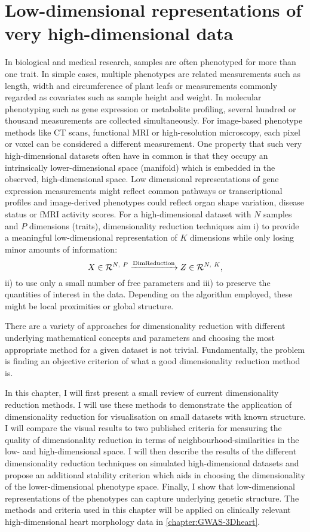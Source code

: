 \chapter{Low-dimensional representations of very high-dimensional data}
\label{chapter:DimReduction}
In biological and medical research, samples are often phenotyped for more than one trait. In simple cases, multiple phenotypes are related measurements such as length, width and circumference of plant leafs or measurements commonly regarded as covariates such as sample height and weight. In molecular phenotyping such as gene expression or metabolite profiling, several hundred or thousand measurements are collected simultaneously.  For image-based phenotype methods like CT scans, functional MRI or high-resolution microscopy, each pixel or voxel can be considered a different measurement. One property that such very high-dimensional datasets often have in common is that they occupy an intrinsically lower-dimensional space (manifold) which is embedded in the observed, high-dimensional space. Low dimensional representations of gene expression measurements might reflect common pathways or transcriptional profiles and image-derived phenotypes could reflect organ shape variation, disease status or fMRI activity scores.  For a high-dimensional dataset  with \(N\) samples and \(P\) dimensions (traits), dimensionality reduction techniques aim i) to provide a meaningful low-dimensional representation  of \(K\) dimensions while only losing minor amounts of information:
\begin{equation}
X \in \mathcal{R}^{N,~P} \xrightarrow{\text{DimReduction}} Z \in \mathcal{R}^{N,~K} ,
\end{equation}
ii) to use only a small number of free parameters and iii) to preserve the quantities of interest in the data. Depending on the algorithm employed, these might be local proximities or global structure. 

There are a variety of approaches for dimensionality reduction with different underlying mathematical concepts and parameters and choosing the most appropriate method for a given dataset is not trivial. Fundamentally, the problem is finding an objective criterion of what a good dimensionality reduction method is. 

In this chapter, I will first present a small review of current dimensionality reduction methods. I will use these methods to demonstrate the application of dimensionality reduction for visualisation on small datasets with known structure. I will compare the visual results to two published criteria for measuring the quality of dimensionality reduction in terms of neighbourhood-similarities in the low- and high-dimensional space. I will then describe the results of the different dimensionality reduction techniques on simulated high-dimensional datasets and propose an additional stability criterion which aids in choosing the dimensionality of the lower-dimensional phenotype space. Finally, I show that low-dimensional representations of the phenotypes can capture underlying genetic structure. The methods and criteria used in this chapter will be applied on clinically relevant high-dimensional heart morphology data in \cref{chapter:GWAS-3Dheart}.

